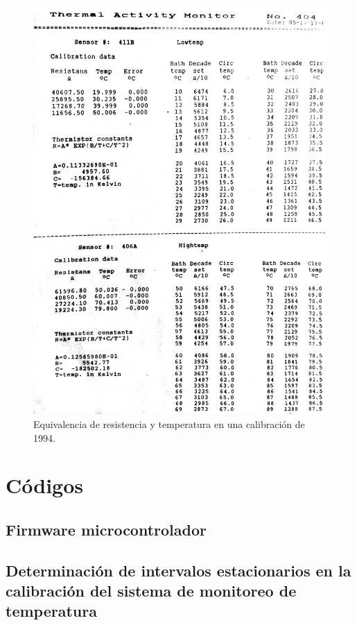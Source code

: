 	\begin{figure}[!h]
		\centering
		\includegraphics[width =\linewidth]{Figures/temperatureTable}
		\caption{Equivalencia de resistencia y temperatura en una calibraci\'on de 1994.}
		\label{fig: temperatureTable}
	\end{figure}

\chapter{Códigos}\label{anx: codigos}
	\section{Firmware microcontrolador}
		
		
	\section{Determinación de intervalos estacionarios en la calibración del sistema de monitoreo de temperatura}
		
		

